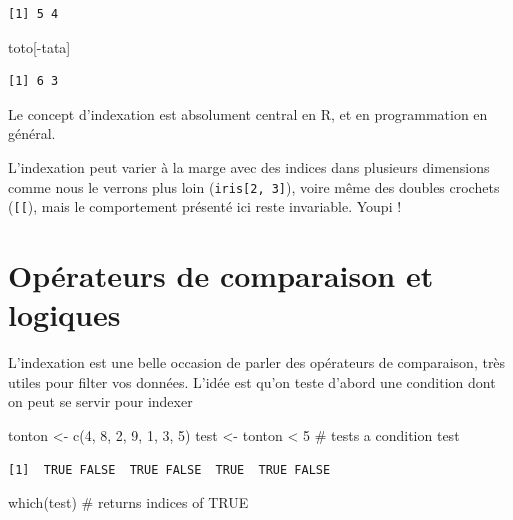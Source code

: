 \documentclass[
  letterpaper,
  DIV=11,
  numbers=noendperiod]{scrreprt}
\newenvironment{Shaded}{\begin{snugshade}}{\end{snugshade}}
\newcommand{\CommentTok}[1]{\textcolor[rgb]{0.37,0.37,0.37}{#1}}
\newcommand{\DecValTok}[1]{\textcolor[rgb]{0.68,0.00,0.00}{#1}}
\newcommand{\FunctionTok}[1]{\textcolor[rgb]{0.28,0.35,0.67}{#1}}
\newcommand{\NormalTok}[1]{\textcolor[rgb]{0.00,0.23,0.31}{#1}}
\newcommand{\OtherTok}[1]{\textcolor[rgb]{0.00,0.23,0.31}{#1}}
\newcommand{\SpecialCharTok}[1]{\textcolor[rgb]{0.37,0.37,0.37}{#1}}
\begin{document}
\begin{verbatim}
[1] 5 4
\end{verbatim}

\begin{Shaded}
\begin{Highlighting}[]
\NormalTok{toto[}\SpecialCharTok{{-}}\NormalTok{tata]}
\end{Highlighting}
\end{Shaded}

\begin{verbatim}
[1] 6 3
\end{verbatim}

Le concept d'indexation est absolument central en R, et en programmation
en général.

L'indexation peut varier à la marge avec des indices dans plusieurs
dimensions comme nous le verrons plus loin (\texttt{iris{[}2,\ 3{]}}),
voire même des doubles crochets (\texttt{{[}{[}}), mais le comportement
présenté ici reste invariable. Youpi !

\hypertarget{opuxe9rateurs-de-comparaison-et-logiques}{%
\section{Opérateurs de comparaison et
logiques}\label{opuxe9rateurs-de-comparaison-et-logiques}}

L'indexation est une belle occasion de parler des opérateurs de
comparaison, très utiles pour filter vos données. L'idée est qu'on teste
d'abord une condition dont on peut se servir pour indexer

\begin{Shaded}
\begin{Highlighting}[]
\NormalTok{tonton }\OtherTok{\textless{}{-}} \FunctionTok{c}\NormalTok{(}\DecValTok{4}\NormalTok{, }\DecValTok{8}\NormalTok{, }\DecValTok{2}\NormalTok{, }\DecValTok{9}\NormalTok{, }\DecValTok{1}\NormalTok{, }\DecValTok{3}\NormalTok{, }\DecValTok{5}\NormalTok{)}
\NormalTok{test }\OtherTok{\textless{}{-}}\NormalTok{ tonton }\SpecialCharTok{\textless{}} \DecValTok{5}  \CommentTok{\# tests a condition}
\NormalTok{test}
\end{Highlighting}
\end{Shaded}

\begin{verbatim}
[1]  TRUE FALSE  TRUE FALSE  TRUE  TRUE FALSE
\end{verbatim}

\begin{Shaded}
\begin{Highlighting}[]
\FunctionTok{which}\NormalTok{(test) }\CommentTok{\# returns indices of TRUE}
\end{Highlighting}
\end{Shaded}
\end{document}
